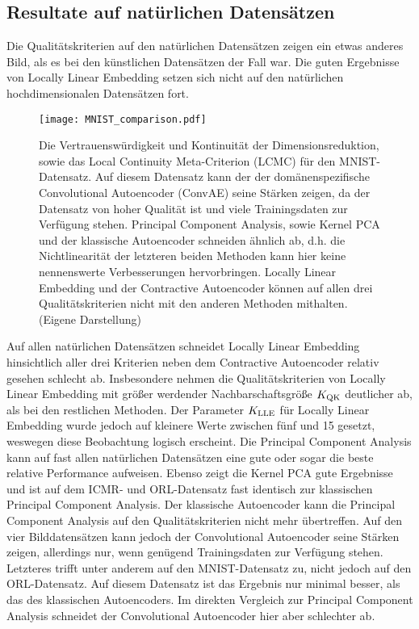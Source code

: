 \subsection{Resultate auf natürlichen Datensätzen}
\label{ch:Vergleich:sec:Resultate:natuerlich}

Die Qualitätskriterien auf den natürlichen Datensätzen zeigen ein etwas anderes Bild, als es bei
den künstlichen Datensätzen der Fall war. Die guten Ergebnisse von Locally Linear Embedding setzen
sich nicht auf den natürlichen hochdimensionalen Datensätzen fort.
\begin{figure}[ht]
	\begin{center}
		\texttt{[image: MNIST\_comparison.pdf]}
	\end{center}
	\caption[Qualitätskriterien für MNIST]{Die Vertrauenswürdigkeit und Kontinuität der Dimensionsreduktion, sowie das Local Continuity Meta-Criterion (LCMC) für den MNIST-Datensatz. Auf diesem Datensatz kann der der domänenspezifische Convolutional Autoencoder (ConvAE) seine Stärken zeigen, da der Datensatz von hoher Qualität ist und viele Trainingsdaten zur Verfügung stehen. Principal Component Analysis, sowie Kernel PCA und der klassische Autoencoder schneiden ähnlich ab, d.h. die Nichtlinearität der letzteren beiden Methoden kann hier keine nennenswerte Verbesserungen hervorbringen. Locally Linear Embedding und der Contractive Autoencoder können auf allen drei Qualitätskriterien nicht mit den anderen Methoden mithalten. (Eigene Darstellung)}
	\label{fig:MNISTMetrics}
\end{figure}
Auf allen natürlichen Datensätzen
schneidet Locally Linear Embedding hinsichtlich aller drei Kriterien neben dem Contractive Autoencoder relativ gesehen schlecht ab. Insbesondere nehmen die
Qualitätskriterien von Locally Linear Embedding mit größer werdender Nachbarschaftsgröße $K_{\text{QK}}$ deutlicher ab, als bei den
restlichen Methoden. Der Parameter $K_{\text{LLE}}$ für Locally Linear Embedding wurde jedoch auf kleinere Werte zwischen fünf und 15 gesetzt, weswegen diese Beobachtung logisch erscheint. Die Principal Component Analysis kann auf fast allen natürlichen Datensätzen eine gute oder sogar die
beste relative Performance aufweisen. Ebenso zeigt die Kernel PCA gute Ergebnisse und ist auf dem ICMR- und ORL-Datensatz fast identisch zur klassischen Principal Component Analysis. Der klassische Autoencoder kann die Principal Component Analysis auf den Qualitätskriterien nicht mehr übertreffen. Auf den vier Bilddatensätzen kann jedoch der Convolutional
Autoencoder seine Stärken zeigen, allerdings nur, wenn genügend Trainingsdaten zur Verfügung stehen. Letzteres trifft unter anderem auf den MNIST-Datensatz zu, nicht jedoch auf den ORL-Datensatz. Auf diesem Datensatz ist das Ergebnis nur minimal besser, als das des klassischen Autoencoders. Im direkten Vergleich zur Principal Component Analysis schneidet der Convolutional Autoencoder hier aber schlechter ab.
